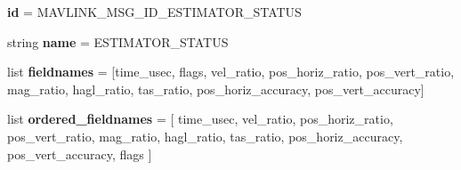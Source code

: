 \begin{DoxyCompactItemize}
\item 
\mbox{\label{classpymavlink_1_1dialects_1_1v10_1_1MAVLink__estimator__status__message_a2bf087ecd9881961b83eca2de9a91fa0}} 
{\bfseries id} = M\+A\+V\+L\+I\+N\+K\+\_\+\+M\+S\+G\+\_\+\+I\+D\+\_\+\+E\+S\+T\+I\+M\+A\+T\+O\+R\+\_\+\+S\+T\+A\+T\+US
\item 
\mbox{\label{classpymavlink_1_1dialects_1_1v10_1_1MAVLink__estimator__status__message_ac8f9757357e5bdf4331ef703a39956f9}} 
string {\bfseries name} = \textquotesingle{}E\+S\+T\+I\+M\+A\+T\+O\+R\+\_\+\+S\+T\+A\+T\+US\textquotesingle{}
\item 
\mbox{\label{classpymavlink_1_1dialects_1_1v10_1_1MAVLink__estimator__status__message_ab138d7572ea9307a6d7489f341f23a3f}} 
list {\bfseries fieldnames} = \mbox{[}\textquotesingle{}time\+\_\+usec\textquotesingle{}, \textquotesingle{}flags\textquotesingle{}, \textquotesingle{}vel\+\_\+ratio\textquotesingle{}, \textquotesingle{}pos\+\_\+horiz\+\_\+ratio\textquotesingle{}, \textquotesingle{}pos\+\_\+vert\+\_\+ratio\textquotesingle{}, \textquotesingle{}mag\+\_\+ratio\textquotesingle{}, \textquotesingle{}hagl\+\_\+ratio\textquotesingle{}, \textquotesingle{}tas\+\_\+ratio\textquotesingle{}, \textquotesingle{}pos\+\_\+horiz\+\_\+accuracy\textquotesingle{}, \textquotesingle{}pos\+\_\+vert\+\_\+accuracy\textquotesingle{}\mbox{]}
\item 
\mbox{\label{classpymavlink_1_1dialects_1_1v10_1_1MAVLink__estimator__status__message_a534f06a4335c79afe2bf7463f3f91610}} 
list {\bfseries ordered\+\_\+fieldnames} = \mbox{[} \textquotesingle{}time\+\_\+usec\textquotesingle{}, \textquotesingle{}vel\+\_\+ratio\textquotesingle{}, \textquotesingle{}pos\+\_\+horiz\+\_\+ratio\textquotesingle{}, \textquotesingle{}pos\+\_\+vert\+\_\+ratio\textquotesingle{}, \textquotesingle{}mag\+\_\+ratio\textquotesingle{}, \textquotesingle{}hagl\+\_\+ratio\textquotesingle{}, \textquotesingle{}tas\+\_\+ratio\textquotesingle{}, \textquotesingle{}pos\+\_\+horiz\+\_\+accuracy\textquotesingle{}, \textquotesingle{}pos\+\_\+vert\+\_\+accuracy\textquotesingle{}, \textquotesingle{}flags\textquotesingle{} \mbox{]}

\end{DoxyCompactItemize}
